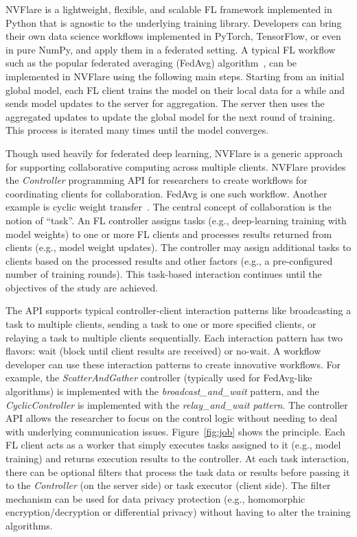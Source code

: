 \documentclass[11pt]{article}
\begin{document}
NVFlare is a lightweight, flexible, and scalable FL framework implemented in Python that is agnostic to the underlying training library. Developers can bring their own data science workflows implemented in PyTorch, TensorFlow, or even in pure NumPy, and apply them in a federated setting.
%
A typical FL workflow such as the popular federated averaging (FedAvg) algorithm~\cite{mcmahan2017communication}, can be implemented in NVFlare using the following main steps. Starting from an initial global model, each FL client trains the model on their local data for a while and sends model updates to the server for aggregation. The server then uses the aggregated updates to update the global model for the next round of training. This process is iterated many times until the model converges.

Though used heavily for federated deep learning, NVFlare is a generic approach for supporting collaborative computing across multiple clients. NVFlare provides the \textit{Controller} programming API for researchers to create workflows for coordinating clients for collaboration. FedAvg is one such workflow. Another example is cyclic weight transfer~\cite{chang2018distributed}. 
%
The central concept of collaboration is the notion of ``task''. An FL controller assigns tasks (e.g., deep-learning training with model weights) to one or more FL clients and processes results returned from clients (e.g., model weight updates). The controller may assign additional tasks to clients based on the processed results and other factors (e.g., a pre-configured number of training rounds). This task-based interaction continues until the objectives of the study are achieved. 

The API supports typical controller-client interaction patterns like broadcasting a task to multiple clients, sending a task to one or more specified clients, or relaying a task to multiple clients sequentially. Each interaction pattern has two flavors: wait (block until client results are received) or no-wait. A workflow developer can use these interaction patterns to create innovative workflows. For example, the \textit{ScatterAndGather} controller (typically used for FedAvg-like algorithms) is implemented with the \textit{broadcast\_and\_wait} pattern, and the \textit{CyclicController} is implemented with the \textit{relay\_and\_wait pattern}. The controller API allows the researcher to focus on the control logic without needing to deal with underlying communication issues. Figure~\ref{fig:job} shows the principle.
%
Each FL client acts as a worker that simply executes tasks assigned to it (e.g., model training) and returns execution results to the controller. At each task interaction, there can be optional filters that process the task data or results before passing it to the \textit{Controller} (on the server side) or task executor (client side). The filter mechanism can be used for data privacy protection (e.g., homomorphic encryption/decryption or differential privacy) without having to alter the training algorithms.
\end{document}
